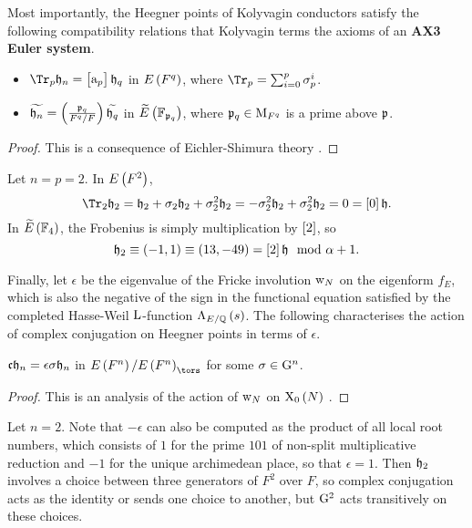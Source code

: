 Most importantly, the Heegner points of Kolyvagin conductors satisfy the following compatibility relations that Kolyvagin terms the axioms of an \textbf{AX3 Euler system}.

\begin{proposition}
\label{prop:eulersystem}
\hfill
\begin{itemize}
\item $ \Tr_p \hhh_n = \sbr{\a_p} \hhh_q $ in $ E\br{F^q} $, where $ \Tr_p = \sum_{i = 0}^p \sigma_p^i $.
\item $ \widetilde{\hhh_n} = \br{\tfrac{\ppp_q}{F^q / F}} \widetilde{\hhh_q} $ in $ \widetilde{E}\br{\FF_{\ppp_q}} $, where $ \mathfrak{p}_q \in \mathrm{M}_{F^q} $ is a prime above $ \mathfrak{p} $.
\end{itemize}
\end{proposition}

\begin{proof}
This is a consequence of Eichler-Shimura theory \cite[Proposition 3.7]{Gro91}.
\end{proof}

\begin{example}
Let $ n = p = 2 $. In $ E\br{F^2} $,
$$ \Tr_2 \hhh_2 = \hhh_2 + \sigma_2 \hhh_2 + \sigma_2^2 \hhh_2 = -\sigma_2^2 \hhh_2 + \sigma_2^2 \hhh_2 = 0 = \sbr{0} \hhh. $$
In $ \widetilde{E}\br{\FF_4} $, the Frobenius is simply multiplication by $ \sbr{2} $, so
$$ \hhh_2 \equiv \br{-1, 1} \equiv \br{13, -49} = \sbr{2} \hhh \mod \alpha + 1. $$
\end{example}

Finally, let $ \epsilon $ be the eigenvalue of the Fricke involution $ \mathrm{w}_N $ on the eigenform $ f_E $, which is also the negative of the sign in the functional equation satisfied by the completed Hasse-Weil $ \mathrm{L} $-function $ \Lambda_{E / \QQ}\br{s} $. The following characterises the action of complex conjugation on Heegner points in terms of $ \epsilon $.

\begin{lemma}
\label{lem:conjugationeigenspace}
$ \mathfrak{c} \mathfrak{h}_n = \epsilon\sigma \mathfrak{h}_n $ in $ E\br{F^n} / E\br{F^n}_{\tors} $ for some $ \sigma \in \mathrm{G}^n $.
\end{lemma}

\begin{proof}
This is an analysis of the action of $ \mathrm{w}_N $ on $ \X_0\br{N} $ \cite[Proposition 5.3]{Gro91}.
\end{proof}

\begin{example}
Let $ n = 2 $. Note that $ -\epsilon $ can also be computed as the product of all local root numbers, which consists of $ 1 $ for the prime $ 101 $ of non-split multiplicative reduction and $ -1 $ for the unique archimedean place, so that $ \epsilon = 1 $. Then $ \mathfrak{h}_2 $ involves a choice between three generators of $ F^2 $ over $ F $, so complex conjugation acts as the identity or sends one choice to another, but $ \mathrm{G}^2 $ acts transitively on these choices.
\end{example}

